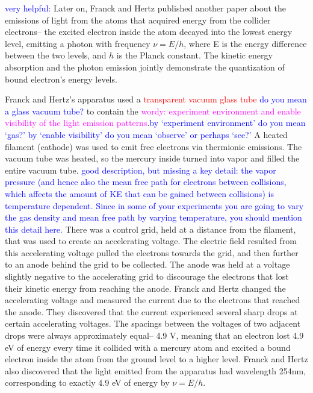 \documentclass[prb,preprint]{revtex4-1}
\begin{document}
\textcolor{blue}{very helpful:} Later on, Franck and Hertz published another paper about the emissions of light from the atoms that acquired energy from the collider electrons-- the excited electron inside the atom decayed into the lowest energy level, emitting a photon with frequency $\nu=E/h$, where E is the energy difference between the two levels, and $h$ is the Planck constant. The kinetic energy absorption and the photon emission jointly demonstrate the quantization of bound electron's energy levels.

Franck and Hertz's apparatus used a \textcolor{red}{transparent vacuum glass tube} \textcolor{blue}{do you mean a glass vacuum tube?} to contain the \textcolor{magenta}{wordy: experiment environment and enable visibility of the light emission patterns}.\textcolor{blue}{by `experiment environment' do you mean `gas?' by `enable visibility' do you mean `observe' or perhaps `see?'} A heated filament (cathode) was used to emit free electrons via thermionic emissions. The vacuum tube was heated, so the mercury inside turned into vapor and filled the entire vacuum tube. \textcolor{blue}{good description, but missing a key detail: the vapor pressure (and hence also the mean free path for electrons between collisions, which affects the amount of KE that can be gained between collisions) is temperature dependent. Since in some of your experiments you are going to vary the gas density and mean free path by varying temperature, you should mention this detail here.} There was a control grid, held at a distance from the filament, that was used to create an accelerating voltage. The electric field resulted from this accelerating voltage pulled the electrons towards the grid, and then further to an anode behind the grid to be collected. The anode was held at a voltage slightly negative to the accelerating grid to discourage the electrons that lost their kinetic energy from reaching the anode. Franck and Hertz changed the accelerating voltage and measured the current due to the electrons that reached the anode. They discovered that the current experienced several sharp drops at certain accelerating voltages. The spacings between the voltages of two adjacent drops were always approximately equal-- 4.9 V, meaning that an electron lost 4.9 eV of energy every time it collided with a mercury atom and excited a bound electron inside the atom from the ground level to a higher level. Franck and Hertz also discovered that the light emitted from the apparatus had wavelength 254nm, corresponding to exactly 4.9 eV of energy by $\nu=E/h$.
\end{document}
